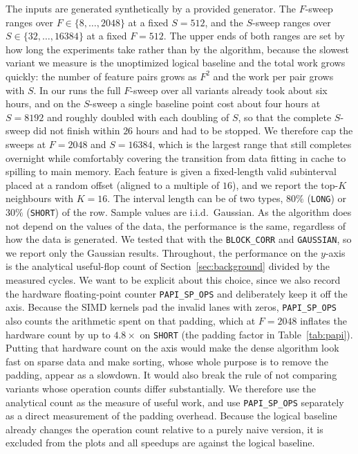 \documentclass[letterpaper]{article}
\begin{document}
The inputs are generated synthetically by a provided generator. The $F$-sweep ranges over $F\in\{8,\dots,2048\}$ at a fixed $S=512$, and the $S$-sweep ranges over $S\in\{32,\dots,16384\}$ at a fixed $F=512$. The upper ends of both ranges are set by how long the experiments take rather than by the algorithm, because the slowest variant we measure is the unoptimized logical baseline and the total work grows quickly: the number of feature pairs grows as $F^2$ and the work per pair grows with $S$. In our runs the full $F$-sweep over all variants already took about six hours, and on the $S$-sweep a single baseline point cost about four hours at $S=8192$ and roughly doubled with each doubling of $S$, so that the complete $S$-sweep did not finish within $26$ hours and had to be stopped. We therefore cap the sweeps at $F=2048$ and $S=16384$, which is the largest range that still completes overnight while comfortably covering the transition from data fitting in cache to spilling to main memory. Each feature is given a fixed-length valid subinterval placed at a random offset (aligned to a multiple of $16$), and we report the top-$K$ neighbours with $K=16$. The interval length can be of two types, $80\%$ (\texttt{LONG}) or $30\%$ (\texttt{SHORT}) of the row. Sample values are i.i.d.\ Gaussian. As the algorithm does not depend on the values of the data, the performance is the same, regardless of how the data is generated. We tested that with the \texttt{BLOCK\_CORR} and \texttt{GAUSSIAN}, so we report only the Gaussian results. Throughout, the performance on the $y$-axis is the analytical useful-flop count of Section~\ref{sec:background} divided by the measured cycles. We want to be explicit about this choice, since we also record the hardware floating-point counter \texttt{PAPI\_SP\_OPS} and deliberately keep it off the axis. Because the SIMD kernels pad the invalid lanes with zeros, \texttt{PAPI\_SP\_OPS} also counts the arithmetic spent on that padding, which at $F=2048$ inflates the hardware count by up to $4.8\times$ on \texttt{SHORT} (the padding factor in Table~\ref{tab:papi}). Putting that hardware count on the axis would make the dense algorithm look fast on sparse data and make sorting, whose whole purpose is to remove the padding, appear as a slowdown. It would also break the rule of not comparing variants whose operation counts differ substantially. We therefore use the analytical count as the measure of useful work, and use \texttt{PAPI\_SP\_OPS} separately as a direct measurement of the padding overhead. Because the logical baseline already changes the operation count relative to a purely naive version, it is excluded from the plots and all speedups are against the logical baseline.
\end{document}

